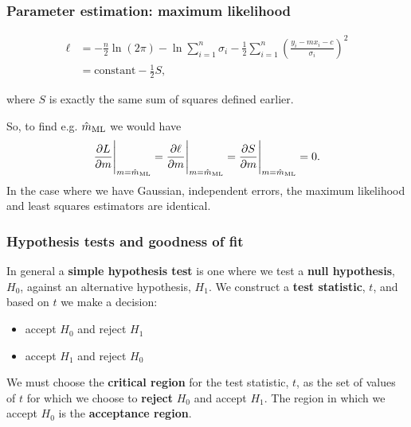 \begin{frame}

\frametitle{Parameter estimation: maximum likelihood}
\label{parameterestimation:maximumlikelihood}

\begin{align*}
\ell &= -\frac{n}{2}\ln{(2\pi)} - \ln{\sum_{i=1}^n \sigma_i} - \frac{1}{2} \sum_{i=1}^n \left( \frac{y_i - mx_i - c}{\sigma_i} \right)^2 \\
 &= \text{constant} - \frac{1}{2} S,
\end{align*}

where $S$ is exactly the same sum of squares defined earlier.

So, to find e.g. $\hat{m}_{\rm ML}$ we would have
\[
\frac{\partial L}{\partial m}\Bigg|_{m=\hat{m}_{\rm ML}} = \frac{\partial \ell}{\partial m}\Bigg|_{m=\hat{m}_{\rm ML}} = \frac{\partial S}{\partial m}\Bigg|_{m=\hat{m}_{\rm ML}} = 0.
\]
In the case where we have Gaussian, independent errors, the maximum likelihood and least squares estimators are identical.

\end{frame}

\begin{frame}

\frametitle{Hypothesis tests and goodness of fit}
\label{hypothesistestsandgoodnessoffit}

In general a \textbf{simple hypothesis test} is one where we test a \textbf{null hypothesis}, $H_0$, against an alternative hypothesis, $H_1$. We construct a \textbf{test statistic}, $t$, and based on $t$ we make a decision:

\begin{itemize}
\item accept $H_0$ and reject $H_1$

\item accept $H_1$ and reject $H_0$

\end{itemize}

We must choose the \textbf{critical region} for the test statistic, $t$, as the set of values of $t$ for which we
choose to \textbf{reject} $H_0$ and accept $H_1$. The region in which we accept $H_0$ is the \textbf{acceptance region}.

\end{frame}

